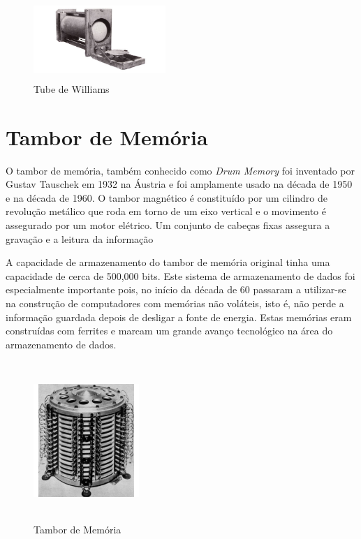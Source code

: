 \documentclass{report}
\begin{document}
	\begin{figure}[h]
		\centering
		\includegraphics[width=5cm, height=3cm]{williamstube.jpg}
		\caption{Tube de Williams}
		\end{figure}	
\newpage

		
		\section{Tambor de Memória}
		 O tambor de memória, também conhecido como\textit{ Drum Memory} foi inventado por Gustav Tauschek em 1932 na Áustria e foi amplamente usado na década de 1950 e na década de 1960.
		 O tambor magnético é constituído por um cilindro de revolução metálico que roda em torno de um eixo vertical e o movimento é assegurado por um motor elétrico. Um conjunto de cabeças fixas assegura a gravação e a leitura da informação
		 
		 A capacidade de armazenamento do tambor de memória original tinha uma capacidade de cerca de 500,000 bits. Este sistema de armazenamento de dados foi especialmente importante pois, no início da década de 60 passaram a utilizar-se na construção de computadores com memórias não voláteis, isto é, não perde a informação guardada depois de desligar a fonte de energia. Estas memórias eram construídas com ferrites e marcam um grande avanço tecnológico na área do armazenamento de dados.
\vspace{30mm}	
	
	\begin{figure}[h]
		\centering
		\includegraphics[width=4cm, height=6cm]{tambordememoria.jpg}
		\caption{Tambor de Memória}
		\end{figure}
\end{document}
